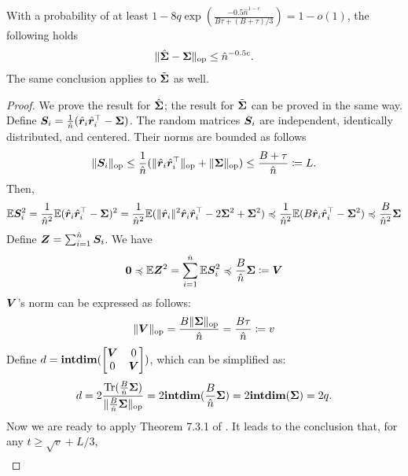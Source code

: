 \begin{lemma}\label{lemma: bernstein_cov}
With a probability of at least $1-8q\exp( \frac{- 0.5 \hat{n}^{1-c} }{ B\tau+ (B+\tau)/3   } )=1-o(1) $, the following holds
\begin{align}
    \nonumber
    \lVert \hat{{\bm{\Sigma}}}-{\bm{\Sigma}} \rVert_{\mathrm{op}} \leq \hat{n}^{-0.5c}.
\end{align}
The same conclusion applies to $\tilde{{\bm{\Sigma}}}$ as well.
\end{lemma}
\begin{proof}
We prove the result for $\hat{{\bm{\Sigma}}}$; the result for $\tilde{{\bm{\Sigma}}}$ can be proved in the same way. 
Define ${\bm{S}}_i = \frac{1}{\hat{n}}(\hat{{\bm{r}}}_i\hat{{\bm{r}}}_i^\top -{\bm{\Sigma}})$. The random matrices ${\bm{S}}_i$ are independent, identically distributed, and centered. Their norms are bounded as follows
\begin{align}
    \nonumber
    \lVert {\bm{S}}_i \rVert_{\mathrm{op}} \leq \frac{1}{\hat{n}}(\lVert \hat{{\bm{r}}}_i\hat{{\bm{r}}}_i^\top \rVert_{\mathrm{op}} + \lVert {\bm{\Sigma}} \rVert_{\mathrm{op}}  ) \leq \frac{ B +  \tau }{ \hat{n}} \coloneqq L.
\end{align}
Then,
\begin{align}
    \nonumber
    \mathbb{E} {\bm{S}}_i^2 = \frac{1}{\hat{n}^2} \mathbb{E}(\hat{{\bm{r}}}_i\hat{{\bm{r}}}_i^\top -{\bm{\Sigma}} )^2 = \frac{1}{\hat{n}^2} \mathbb{E}(\|\hat{{\bm{r}}}_i\|^2\hat{{\bm{r}}}_i\hat{{\bm{r}}}_i^\top -2{\bm{\Sigma}}^2  +{\bm{\Sigma}}^2 )  \preccurlyeq \frac{1}{\hat{n}^2} \mathbb{E}(B\hat{{\bm{r}}}_i\hat{{\bm{r}}}_i^\top -{\bm{\Sigma}}^2 ) \preccurlyeq \frac{B}{\hat{n}^2}{\bm{\Sigma}}
\end{align}
Define ${\bm{Z}} = \sum_{i=1}^{\hat{n}} {\bm{S}}_i $. We have
\begin{align}
    \nonumber
    \mathbf{0} \preccurlyeq \mathbb{E} {\bm{Z}}^2 = \sum_{i=1}^{\hat{n}} \mathbb{E} {\bm{S}}_i^2 \preccurlyeq \frac{B}{\hat{n}}{\bm{\Sigma}} \coloneqq {\bm{V}}
\end{align}
${\bm{V}}$'s norm can be expressed as follows:
\begin{align}
    \nonumber
   \lVert {\bm{V}} \rVert_{\mathrm{op}} = \frac{B \lVert {\bm{\Sigma}} \rVert_{\mathrm{op}} }{\hat{n}} = \frac{B\tau}{\hat{n}}\coloneqq v
\end{align}
Define $d =\textbf{intdim}(\begin{bmatrix}  {\bm{V}}  & 0 \\ 0 &  {\bm{V}} \end{bmatrix}  )$, which can be simplified as:
\begin{align}
\nonumber
    d = 2\frac{\operatorname{Tr}(  \frac{B}{\hat{n}}{\bm{\Sigma}}  )}{ \lVert  \frac{B}{\hat{n}}{\bm{\Sigma}}  \rVert_{\mathrm{op}} } = 2\textbf{intdim}(  \frac{B}{\hat{n}}{\bm{\Sigma}}  ) =2\textbf{intdim}({\bm{\Sigma}}) =2q.
\end{align}
Now we are ready to apply Theorem 7.3.1 of \cite{tropp2015introduction}. It leads to the conclusion that, for any $t\geq \sqrt{v}+L/3$,
\begin{align}

\end{align}
\end{proof}
